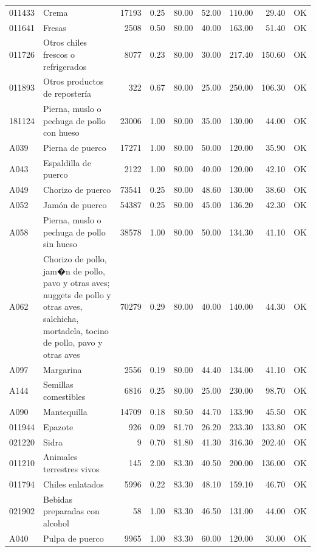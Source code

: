 \begin{table}[ht]
\begin{tabular}{llrrrrrrl}
  011433 & Crema & 17193 & 0.25 & 80.00 & 52.00 & 110.00 & 29.40 & OK \\ 
  011641 & Fresas & 2508 & 0.50 & 80.00 & 40.00 & 163.00 & 51.40 & OK \\ 
  011726 & Otros chiles frescos o refrigerados & 8077 & 0.23 & 80.00 & 30.00 & 217.40 & 150.60 & OK \\ 
  011893 & Otros productos de repostería & 322 & 0.67 & 80.00 & 25.00 & 250.00 & 106.30 & OK \\ 
  181124 & Pierna, muslo o pechuga de pollo con hueso & 23006 & 1.00 & 80.00 & 35.00 & 130.00 & 44.00 & OK \\ 
  A039 & Pierna de puerco & 17271 & 1.00 & 80.00 & 50.00 & 120.00 & 35.90 & OK \\ 
  A043 & Espaldilla de puerco & 2122 & 1.00 & 80.00 & 40.00 & 120.00 & 42.10 & OK \\ 
  A049 & Chorizo de puerco & 73541 & 0.25 & 80.00 & 48.60 & 130.00 & 38.60 & OK \\ 
  A052 & Jamón de puerco & 54387 & 0.25 & 80.00 & 45.00 & 136.20 & 42.30 & OK \\ 
  A058 & Pierna, muslo o pechuga de pollo sin hueso & 38578 & 1.00 & 80.00 & 50.00 & 134.30 & 41.10 & OK \\ 
  A062 & Chorizo de pollo, jam�n de pollo, pavo y otras aves; nuggets de pollo y otras aves, salchicha, mortadela, tocino de pollo, pavo y otras aves & 70279 & 0.29 & 80.00 & 40.00 & 140.00 & 44.30 & OK \\ 
  A097 & Margarina & 2556 & 0.19 & 80.00 & 44.40 & 134.00 & 41.10 & OK \\ 
  A144 & Semillas comestibles & 6816 & 0.25 & 80.00 & 25.00 & 230.00 & 98.70 & OK \\ 
  A090 & Mantequilla & 14709 & 0.18 & 80.50 & 44.70 & 133.90 & 45.50 & OK \\ 
  011944 & Epazote & 926 & 0.09 & 81.70 & 26.20 & 233.30 & 133.80 & OK \\ 
  021220 & Sidra &   9 & 0.70 & 81.80 & 41.30 & 316.30 & 202.40 & OK \\ 
  011210 & Animales terrestres vivos & 145 & 2.00 & 83.30 & 40.50 & 200.00 & 136.00 & OK \\ 
  011794 & Chiles enlatados & 5996 & 0.22 & 83.30 & 48.10 & 159.10 & 46.70 & OK \\ 
  021902 & Bebidas preparadas con alcohol &  58 & 1.00 & 83.30 & 46.50 & 131.00 & 44.00 & OK \\ 
  A040 & Pulpa de puerco & 9965 & 1.00 & 83.30 & 60.00 & 120.00 & 30.00 & OK \\ 

\end{tabular}
\end{table}
